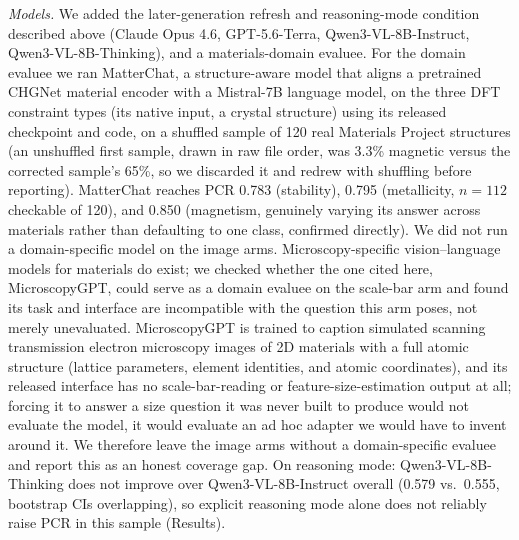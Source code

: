 \documentclass[pdflatex,sn-nature]{sn-jnl}
\begin{document}
\noindent\emph{Models.} We added the later-generation refresh and reasoning-mode
condition described above (Claude Opus 4.6, GPT-5.6-Terra, Qwen3-VL-8B-Instruct,
Qwen3-VL-8B-Thinking), and a materials-domain evaluee. For the domain evaluee we ran
MatterChat\cite{matterchat2026}, a structure-aware model that aligns a pretrained CHGNet
material encoder with a Mistral-7B language model, on the three DFT constraint types (its
native input, a crystal structure) using its released checkpoint and code, on a shuffled
sample of 120 real Materials Project structures (an unshuffled first sample, drawn in raw
file order, was 3.3\% magnetic versus the corrected sample's 65\%, so we discarded it and
redrew with shuffling before reporting). MatterChat reaches PCR 0.783 (stability), 0.795
(metallicity, $n=112$ checkable of 120), and 0.850 (magnetism, genuinely varying its answer
across materials rather than defaulting to one class, confirmed directly). We did not run a domain-specific model on the image arms.
Microscopy-specific vision--language models for materials do exist; we checked whether the
one cited here, MicroscopyGPT,\cite{choudhary2025microscopygpt} could serve as a domain
evaluee on the scale-bar arm and found its task and interface are incompatible with the
question this arm poses, not merely unevaluated. MicroscopyGPT is trained to caption
simulated scanning transmission electron microscopy images of 2D materials with a full
atomic structure (lattice parameters, element identities, and atomic coordinates), and its
released interface has no scale-bar-reading or feature-size-estimation output at all; forcing
it to answer a size question it was never built to produce would not evaluate the model, it
would evaluate an ad hoc adapter we would have to invent around it. We therefore leave the
image arms without a domain-specific evaluee and report this as an honest coverage gap. On reasoning mode: Qwen3-VL-8B-Thinking does not improve over
Qwen3-VL-8B-Instruct overall (0.579 vs.\ 0.555, bootstrap CIs overlapping), so explicit
reasoning mode alone does not reliably raise PCR in this sample (Results).
\end{document}
